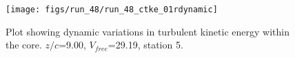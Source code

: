 \begin{figure}[H]
\centering
\texttt{[image: figs/run\_48/run\_48\_ctke\_01rdynamic]}
\caption{Plot showing dynamic variations in turbulent kinetic energy within the core. $z/c$=9.00, $V_{free}$=29.19, station 5.}
\end{figure}


